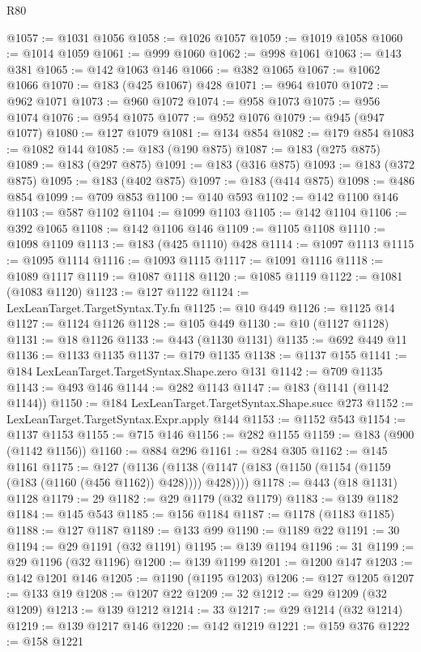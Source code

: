 \begin{lexlean}{R80}
\begin{coremodule}
@1057 := @1031 @1056
@1058 := @1026 @1057
@1059 := @1019 @1058
@1060 := @1014 @1059
@1061 := @999 @1060
@1062 := @998 @1061
@1063 := @143 @381
@1065 := @142 @1063 @146
@1066 := @382 @1065
@1067 := @1062 @1066
@1070 := @183 (@425 @1067) @428
@1071 := @964 @1070
@1072 := @962 @1071
@1073 := @960 @1072
@1074 := @958 @1073
@1075 := @956 @1074
@1076 := @954 @1075
@1077 := @952 @1076
@1079 := @945 (@947 @1077)
@1080 := @127 @1079
@1081 := @134 @854
@1082 := @179 @854
@1083 := @1082 @144
@1085 := @183 (@190 @875)
@1087 := @183 (@275 @875)
@1089 := @183 (@297 @875)
@1091 := @183 (@316 @875)
@1093 := @183 (@372 @875)
@1095 := @183 (@402 @875)
@1097 := @183 (@414 @875)
@1098 := @486 @854
@1099 := @709 @853
@1100 := @140 @593
@1102 := @142 @1100 @146
@1103 := @587 @1102
@1104 := @1099 @1103
@1105 := @142 @1104
@1106 := @392 @1065
@1108 := @142 @1106 @146
@1109 := @1105 @1108
@1110 := @1098 @1109
@1113 := @183 (@425 @1110) @428
@1114 := @1097 @1113
@1115 := @1095 @1114
@1116 := @1093 @1115
@1117 := @1091 @1116
@1118 := @1089 @1117
@1119 := @1087 @1118
@1120 := @1085 @1119
@1122 := @1081 (@1083 @1120)
@1123 := @127 @1122
@1124 := LexLeanTarget.TargetSyntax.Ty.fn
@1125 := @10 @449
@1126 := @1125 @14
@1127 := @1124 @1126
@1128 := @105 @449
@1130 := @10 (@1127 @1128)
@1131 := @18 @1126
@1133 := @443 (@1130 @1131)
@1135 := @692 @449 @11
@1136 := @1133 @1135
@1137 := @179 @1135
@1138 := @1137 @155
@1141 := @184 LexLeanTarget.TargetSyntax.Shape.zero @131
@1142 := @709 @1135
@1143 := @493 @146
@1144 := @282 @1143
@1147 := @183 (@1141 (@1142 @1144))
@1150 := @184 LexLeanTarget.TargetSyntax.Shape.succ @273
@1152 := LexLeanTarget.TargetSyntax.Expr.apply @144
@1153 := @1152 @543
@1154 := @1137 @1153
@1155 := @715 @146
@1156 := @282 @1155
@1159 := @183 (@900 (@1142 @1156))
@1160 := @884 @296
@1161 := @284 @305
@1162 := @145 @1161
@1175 := @127
    (@1136 (@1138 (@1147 (@183 (@1150 (@1154 (@1159 (@183 (@1160 (@456 @1162)) @428)))) @428))))
@1178 := @443 (@18 @1131) @1128
@1179 := 29
@1182 := @29 @1179 (@32 @1179)
@1183 := @139 @1182
@1184 := @145 @543
@1185 := @156 @1184
@1187 := @1178 (@1183 @1185)
@1188 := @127 @1187
@1189 := @133 @99
@1190 := @1189 @22
@1191 := 30
@1194 := @29 @1191 (@32 @1191)
@1195 := @139 @1194
@1196 := 31
@1199 := @29 @1196 (@32 @1196)
@1200 := @139 @1199
@1201 := @1200 @147
@1203 := @142 @1201 @146
@1205 := @1190 (@1195 @1203)
@1206 := @127 @1205
@1207 := @133 @19
@1208 := @1207 @22
@1209 := 32
@1212 := @29 @1209 (@32 @1209)
@1213 := @139 @1212
@1214 := 33
@1217 := @29 @1214 (@32 @1214)
@1219 := @139 @1217 @146
@1220 := @142 @1219
@1221 := @159 @376
@1222 := @158 @1221

\end{coremodule}
\end{lexlean}
